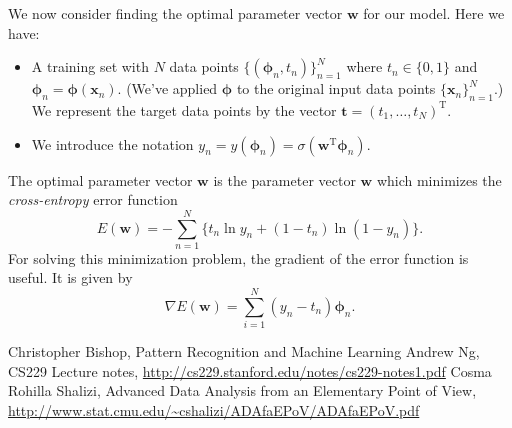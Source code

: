 \documentclass[11pt]{amsart}
\theoremstyle{definition}
\theoremstyle{remark}
\newcommand{\vect}[1]{\mathbf{#1}}
\newcommand{\transpose}{\text{T}}
\begin{document}
    We now consider finding the optimal parameter vector $\vect{w}$ for our model. Here we have:
    \begin{itemize}
        \item A training set with $N$ data points $\{(\bm{\phi}_n, t_n)\}_{n=1}^{N}$ where $t_n \in \{0, 1\}$ and $\bm{\phi}_n = \bm{\phi}(\vect{x}_n)$. (We've applied $\bm{\phi}$ to the original input data points $\{\vect{x}_n\}_{n=1}^{N}$.) We represent the target data points by the vector $\vect{t} = (t_1, \dots, t_N)^\transpose$.
        \item We introduce the notation $y_n = y(\bm{\phi}_n) = \sigma(\vect{w}^\transpose \bm{\phi}_n)$.
    \end{itemize}
    The optimal parameter vector $\vect{w}$ is the parameter vector $\vect{w}$ which minimizes the \emph{cross-entropy} error function
    \begin{equation*}
        E(\vect{w}) =  - \sum_{n=1}^{N} 
                       \{t_n \ln y_n + (1 - t_n)\ln(1 - y_n)\}.
    \end{equation*}
    For solving this minimization problem, the gradient of the error function is useful. It is given by
    \begin{equation*}
        \nabla E(\vect{w}) = \sum_{i=1}^{N} (y_n - t_n)\bm{\phi}_n.
    \end{equation*}

\renewcommand\refname{Bibliography}
\begin{thebibliography}{99}
     Christopher Bishop, Pattern Recognition and Machine Learning
     Andrew Ng, CS229 Lecture notes, \url{http://cs229.stanford.edu/notes/cs229-notes1.pdf}
     Cosma Rohilla Shalizi, Advanced Data Analysis
from an Elementary Point of View, \url{http://www.stat.cmu.edu/~cshalizi/ADAfaEPoV/ADAfaEPoV.pdf} 
\end{thebibliography}




\end{document}
